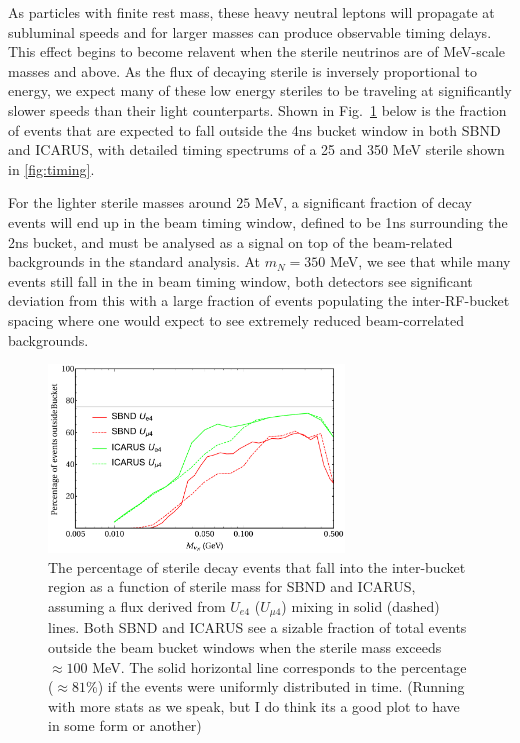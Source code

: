 \documentclass[11pt, a4paper]{article}
\newcommand{\reffig}[1]{Fig.~\ref{#1}}
\begin{document}
As particles with finite rest mass, these heavy neutral leptons will propagate at subluminal speeds and for larger masses can produce observable timing delays. This effect begins to become relavent when the sterile neutrinos are of MeV-scale masses and above. As the flux of decaying sterile is inversely proportional to energy, we expect many of these low energy steriles to be traveling at significantly slower speeds than their light counterparts. Shown in \reffig{fig:timing_line} below is the fraction of events that are expected to fall outside the 4ns bucket window in both SBND and ICARUS, with detailed timing spectrums of a 25 and 350 MeV sterile shown in \ref{fig:timing}.

For the lighter sterile masses around $25$ MeV, a significant fraction of decay events will end up in the beam timing window, defined to be 1ns surrounding the 2ns bucket, and must be analysed as a signal on top of the beam-related backgrounds in the standard analysis. At $m_{N}=350$ MeV, we see that while many events still fall in the in beam timing window,
both detectors see significant deviation from this with a large fraction of events populating
the inter-RF-bucket spacing where one would expect to see extremely reduced
beam-correlated backgrounds. \\
\begin{figure}[t]
%
\center
%
\includegraphics[width=0.7\textwidth]{figures/line_plots.pdf}
%
\caption{\label{fig:timing_line} The percentage of sterile decay events that fall into the inter-bucket region as a function of sterile mass for SBND and ICARUS, assuming a flux derived from $U_{e4}$ ($U_{\mu 4}$) mixing in solid (dashed) lines. Both SBND and ICARUS see a sizable fraction of total events outside the beam bucket windows when the sterile mass exceeds $\approx100$ MeV. The solid horizontal line corresponds to the percentage ($\approx 81$\%) if the events were uniformly distributed in time. (Running with more stats as we speak, but I do think its a good plot to have in some form or another)  
}
%
\end{figure}
\end{document}
